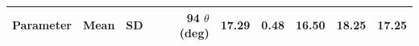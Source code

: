 \begin{tabular}{lrrrrr}
\toprule
Parameter & Mean & SD & 94%
\midrule
$\theta$ (deg) & 17.29 & 0.48 & 16.50 & 18.25 & 17.25 \\
\bottomrule
\end{tabular}
